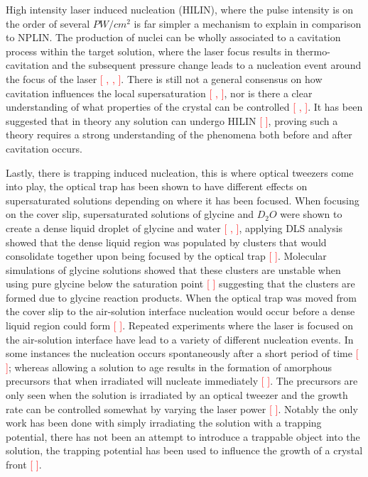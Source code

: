 High intensity laser induced nucleation (HILIN), where the pulse intensity 
is on the order of several $PW/cm^2$ is far simpler a mechanism to explain 
in comparison to NPLIN. The production of nuclei can be wholly associated 
to a cavitation process within the target solution, where the laser focus 
results in thermo-cavitation and the subsequent pressure change leads to
a nucleation event around the focus of the laser \textcolor{red}{[ , , ]}. 
There is still not a general consensus on how cavitation influences the 
local supersaturation \textcolor{red}{[ , ]}, nor is there a clear 
understanding of what properties of the crystal can be controlled 
\textcolor{red}{[ , ]}. It has been suggested that in theory any solution 
can undergo HILIN \textcolor{red}{[ ]}, proving such a theory requires a 
strong understanding of the phenomena both before and after cavitation 
occurs.  

Lastly, there is trapping induced nucleation, this is where optical tweezers 
come into play, the optical trap has been shown to have different effects 
on supersaturated solutions depending on where it has been focused. When 
focusing on the cover slip, supersaturated solutions of glycine and $D_2O$ 
were shown to create a dense liquid droplet of glycine and water 
\textcolor{red}{[ , ]}, applying DLS analysis showed that the dense liquid 
region was populated by clusters that would consolidate together upon being 
focused by the optical trap \textcolor{red}{[ ]}. Molecular simulations of 
glycine solutions showed that these clusters are unstable when using pure 
glycine below the saturation point \textcolor{red}{[ ]} suggesting that the 
clusters are formed due to glycine reaction products. When the optical trap 
was moved from the cover slip to the air-solution interface nucleation would 
occur before a dense liquid region could form \textcolor{red}{[ ]}. Repeated 
experiments where the laser is focused on the air-solution interface have 
lead to a variety of different nucleation events. In some instances the 
nucleation occurs spontaneously after a short period of time \textcolor{red}{[ ]}; 
whereas allowing a solution to age results in the formation of amorphous 
precursors that when irradiated will nucleate immediately \textcolor{red}{[ ]}. 
The precursors are only seen when the solution is irradiated by an optical tweezer 
and the growth rate can be controlled somewhat by varying the laser power 
\textcolor{red}{[ ]}. Notably the only work has been done with simply 
irradiating the solution with a trapping potential, there has not been an 
attempt to introduce a trappable object into the solution, the trapping 
potential has been used to influence the growth of a crystal front 
\textcolor{red}{[ ]}.

